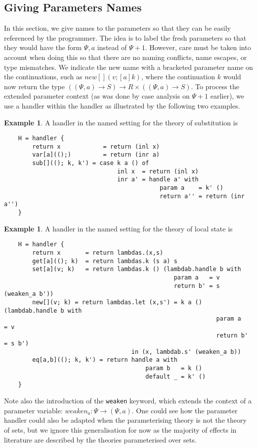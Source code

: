 \documentclass{scrartcl}
\theoremstyle{definition}
\newtheorem{example}[theorem]{Example}
\newcommand{\PCtx}{\Psi}
\begin{document}
\subsection{Giving Parameters Names}

In this section, we give names to the parameters so that they can be easily referenced by the programmer. The idea is to label the fresh parameters so that they would have the form $\PCtx,a$ instead of $\PCtx+1$. However, care must be taken into account when doing this so that there are no naming conflicts, name escapes, or type mismatches. We indicate the new name with a bracketed parameter name on the continuations, such as $new[](v; [a]k)$, where the continuation $k$ would now return the type $((\PCtx,a)\to S)\to R\times ((\PCtx,a)\to S)$. To process the extended parameter context (as was done by case analysis on $\PCtx+1$ earlier), we use a handler within the handler as illustrated by the following two examples.

\begin{example}
A handler in the named setting for the theory of substitution is
\begin{lstlisting}
    H = handler {
        return x            = return (inl x)
        var[a](();)         = return (inr a)
        sub[]((); k, k') = case k a () of
                                inl x  = return (inl x)
                                inr a' = handle a' with
                                            param a    = k' ()
                                            return a'' = return (inr a'')
    }
\end{lstlisting}
\end{example}

\begin{example} \label{ex:named_sub}
A handler in the named setting for the theory of local state is
\begin{lstlisting}
    H = handler {
        return x       = return lambdas.(x,s)
        get[a]((); k)  = return lambdas.k (s a) s
        set[a](v; k)   = return lambdas.k () (lambdab.handle b with
                                                param a   = v
                                                return b' = s (weaken_a b'))
        new[](v; k) = return lambdas.let (x,s') = k a () (lambdab.handle b with
                                                            param a   = v
                                                            return b' = s b')
                                    in (x, lambdab.s' (weaken_a b))
        eq[a,b]((); k, k') = return handle a with
                                        param b   = k ()
                                        default _ = k' ()
    }
\end{lstlisting}
\end{example}
Note also the introduction of the \lstinline{weaken} keyword, which extends the context of a parameter variable: $weaken_a:\PCtx \to (\PCtx, a)$. One could see how the parameter handler could also be adapted when the parameterising theory is not the theory of sets, but we ignore this generalisation for now as the majority of effects in literature are described by the theories parameterised over sets.
\end{document}
